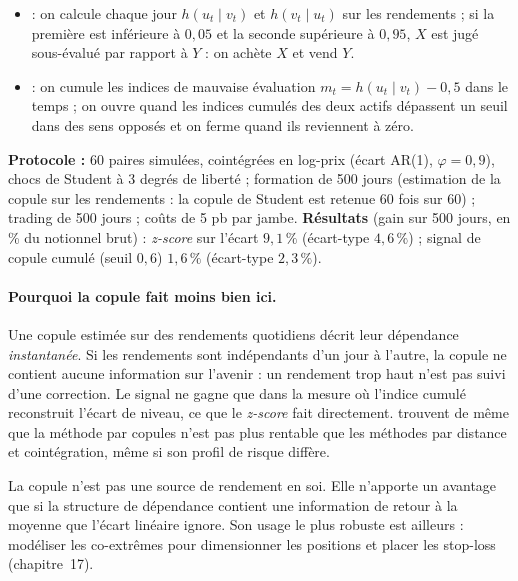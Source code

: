 \begin{itemize}
\item \citet{liewwu2013} : on calcule chaque jour $h(u_t\mid v_t)$ et $h(v_t\mid u_t)$ sur les rendements ; si la première est inférieure à $0{,}05$ et la seconde supérieure à $0{,}95$, $X$ est jugé sous-évalué par rapport à $Y$ : on achète $X$ et vend $Y$.
\item \citet{xie2016} : on cumule les \og indices de mauvaise évaluation\fg{} $m_t = h(u_t\mid v_t) - 0{,}5$ dans le temps ; on ouvre quand les indices cumulés des deux actifs dépassent un seuil dans des sens opposés et on ferme quand ils reviennent à zéro.
\end{itemize}

\begin{codebox}
\textbf{Protocole :} 60 paires simulées, cointégrées en log-prix (écart AR(1), $\varphi = 0{,}9$), chocs de Student à 3 degrés de liberté ; formation de 500 jours (estimation de la copule sur les rendements : la copule de Student est retenue 60 fois sur 60) ; trading de 500 jours ; coûts de 5 pb par jambe. \textbf{Résultats} (gain sur 500 jours, en \% du notionnel brut) : \emph{z-score} sur l'écart $9{,}1\,\%$ (écart-type $4{,}6\,\%$) ; signal de copule cumulé (seuil $0{,}6$) $1{,}6\,\%$ (écart-type $2{,}3\,\%$).
\end{codebox}

\paragraph{Pourquoi la copule fait moins bien ici.} Une copule estimée sur des rendements quotidiens décrit leur dépendance \emph{instantanée}. Si les rendements sont indépendants d'un jour à l'autre, la copule ne contient aucune information sur l'avenir : un \og rendement trop haut\fg{} n'est pas suivi d'une correction. Le signal ne gagne que dans la mesure où l'indice cumulé reconstruit l'écart de niveau, ce que le \emph{z-score} fait directement. \citet{rad2016} trouvent de même que la méthode par copules n'est pas plus rentable que les méthodes par distance et cointégration, même si son profil de risque diffère.

\begin{pitfall}
La copule n'est pas une source de rendement en soi. Elle n'apporte un avantage que si la structure de dépendance contient une information de retour à la moyenne que l'écart linéaire ignore. Son usage le plus robuste est ailleurs : modéliser les co-extrêmes pour dimensionner les positions et placer les stop-loss (chapitre~17).
\end{pitfall}

